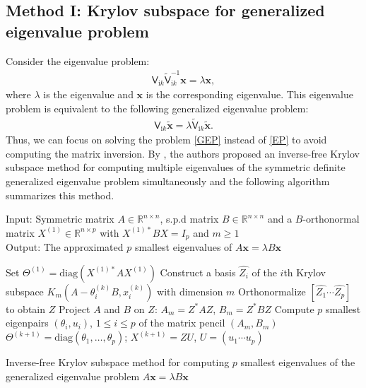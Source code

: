 \subsection{Method I: Krylov subspace for generalized eigenvalue problem}
Consider the eigenvalue problem: 
\begin{align} \label{EP}
    \mathsf{V}_{\mathrm{i}k}\tilde{\mathsf{V}}_{\mathrm{i}k}^{-1}\boldsymbol{x} = \lambda\boldsymbol{x},
\end{align}
where $\lambda$ is the eigenvalue and $\boldsymbol{x}$ is the corresponding eigenvalue. This eigenvalue problem is equivalent to the following generalized eigenvalue problem:
\begin{align}\label{GEP}
    \mathsf{V}_{\mathrm{i}k}\tilde{\boldsymbol{x}} = \lambda \tilde{\mathsf{V}}_{\mathrm{i}k}\tilde{\boldsymbol{x}}.
\end{align}
Thus, we can focus on solving the problem \eqref{GEP} instead of \eqref{EP} to avoid computing the matrix inversion. By \cite{quillen2010block}, the authors 
proposed an inverse-free Krylov subspace method for computing multiple eigenvalues of the symmetric definite generalized eigenvalue problem simultaneously 
and the following algorithm summarizes this method.
\begin{algorithm}[H]
    \SetAlgoLined
    Input: Symmetric matrix $A\in\mathbb{R}^{n\times n}$, s.p.d matrix $B\in\mathbb{R}^{n\times n}$ and a $B$-orthonormal matrix
    $X^{(1)} \in\mathbb{R}^{n\times p}$ with $X^{(1)*}BX = I_{p}$ and $m\geq 1$\\
    
    Output: The approximated $p$ smallest eigenvalues of $A\boldsymbol{x} = \lambda B\boldsymbol{x}$\\
    \begin{algorithmic}[1]
        \STATE Set $\Theta^{(1)} = \text{diag}(X^{(1)*}AX^{(1)})$
                    \STATE Construct a basis $\hat{Z_{i}}$ of the $i$th Krylov subspace $K_{m}(A - \theta_{i}^{(k)}B, x_{i}^{(k)})$ with dimension $m$
                    \STATE Orthonormalize $\left[\hat{Z_{1}} \cdots \hat{Z_{p}}\right]$ to obtain $Z$
                    \STATE Project $A$ and $B$ on $Z$: $A_{m} = Z^{*}AZ$, $B_{m} = Z^{*}BZ$
                    \STATE Compute $p$ smallest eigenpairs $(\theta_{i}, u_{i})$, $1\leq i \leq p$ of the matrix pencil $(A_{m}, B_{m})$
                    \STATE $\Theta^{(k+1)} = \text{diag}(\theta_{1}, \dots, \theta_{p})$; $X^{(k+1)} = ZU$, $U = (u_{1} \cdots u_{p})$
                \ENDFOR
        \ENDFOR
        \end{algorithmic}
    \caption{Inverse-free Krylov subspace method for computing $p$ smallest eigenvalues of the generalized eigenvalue problem $A\boldsymbol{x} = \lambda B\boldsymbol{x}$}
    \label{Alg for computing the evals}
    \end{algorithm}
    
